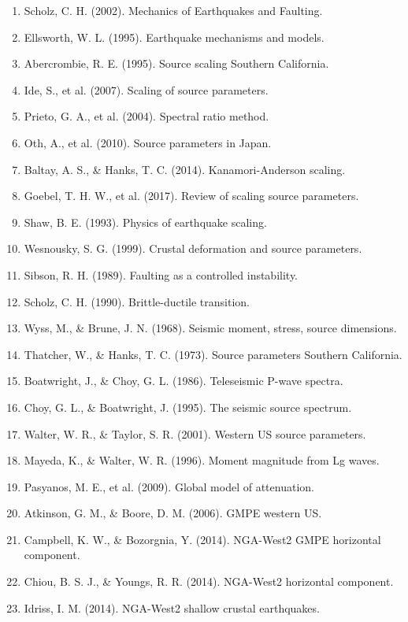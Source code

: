 \documentclass[12pt,a4paper]{article}
\begin{document}
\begin{enumerate}
    \item Scholz, C. H. (2002). Mechanics of Earthquakes and Faulting.
    \item Ellsworth, W. L. (1995). Earthquake mechanisms and models.
    \item Abercrombie, R. E. (1995). Source scaling Southern California.
    \item Ide, S., et al. (2007). Scaling of source parameters.
    \item Prieto, G. A., et al. (2004). Spectral ratio method.
    \item Oth, A., et al. (2010). Source parameters in Japan.
    \item Baltay, A. S., \& Hanks, T. C. (2014). Kanamori-Anderson scaling.
    \item Goebel, T. H. W., et al. (2017). Review of scaling source parameters.
    \item Shaw, B. E. (1993). Physics of earthquake scaling.
    \item Wesnousky, S. G. (1999). Crustal deformation and source parameters.
    \item Sibson, R. H. (1989). Faulting as a controlled instability.
    \item Scholz, C. H. (1990). Brittle-ductile transition.
    \item Wyss, M., \& Brune, J. N. (1968). Seismic moment, stress, source dimensions.
    \item Thatcher, W., \& Hanks, T. C. (1973). Source parameters Southern California.
    \item Boatwright, J., \& Choy, G. L. (1986). Teleseismic P-wave spectra.
    \item Choy, G. L., \& Boatwright, J. (1995). The seismic source spectrum.
    \item Walter, W. R., \& Taylor, S. R. (2001). Western US source parameters.
    \item Mayeda, K., \& Walter, W. R. (1996). Moment magnitude from Lg waves.
    \item Pasyanos, M. E., et al. (2009). Global model of attenuation.
    \item Atkinson, G. M., \& Boore, D. M. (2006). GMPE western US.
    \item Campbell, K. W., \& Bozorgnia, Y. (2014). NGA-West2 GMPE horizontal component.
    \item Chiou, B. S. J., \& Youngs, R. R. (2014). NGA-West2 horizontal component.
    \item Idriss, I. M. (2014). NGA-West2 shallow crustal earthquakes.

\end{enumerate}
\end{document}
